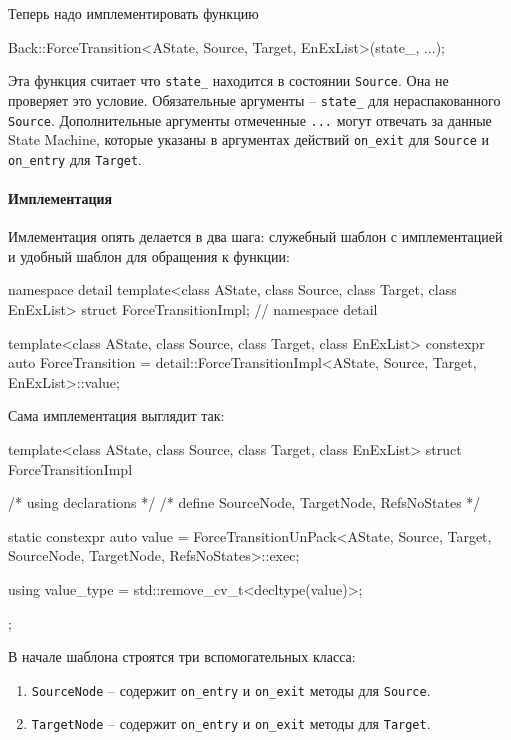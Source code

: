 \documentclass{article}
\begin{document}
{Теперь надо имплементировать функцию
\begin{cppcode}[\nonumbers]
Back::ForceTransition<AState, Source, Target, EnExList>(state_, ...);
\end{cppcode}
Эта функция считает что \verb"state_" находится в состоянии \verb"Source".
Она не проверяет это условие.
Обязательные аргументы -- \verb"state_" для нераспакованного \verb"Source".
Дополнительные аргументы отмеченные \verb"..." могут отвечать за данные State Machine, которые указаны в аргументах действий \verb"on_exit" для \verb"Source" и \verb"on_entry" для \verb"Target".

\paragraph{Имплементация}

Имлементация опять делается в два шага: служебный шаблон с имплементацией и удобный шаблон для обращения к функции:
\begin{cppcode}
namespace detail {
template<class AState, class Source, class Target, class EnExList>
struct ForceTransitionImpl;
} // namespace detail

template<class AState, class Source, class Target, class EnExList>
constexpr auto ForceTransition =
    detail::ForceTransitionImpl<AState, Source, Target, EnExList>::value;

\end{cppcode}
Сама имплементация выглядит так:
\begin{cppcode}

template<class AState, class Source, class Target, class EnExList>
struct ForceTransitionImpl {
  /* using declarations */
  /* define SourceNode, TargetNode, RefsNoStates */

  static constexpr auto value =
      ForceTransitionUnPack<AState, Source, Target, SourceNode, TargetNode,
                            RefsNoStates>::exec;

  using value_type = std::remove_cv_t<decltype(value)>;
};
\end{cppcode}
В начале шаблона строятся три вспомогательных класса:
\begin{enumerate}
\item \verb"SourceNode" -- содержит \verb"on_entry" и \verb"on_exit" методы для \verb"Source".

\item \verb"TargetNode" -- содержит \verb"on_entry" и \verb"on_exit" методы для \verb"Target".


\end{enumerate}}
\end{document}
